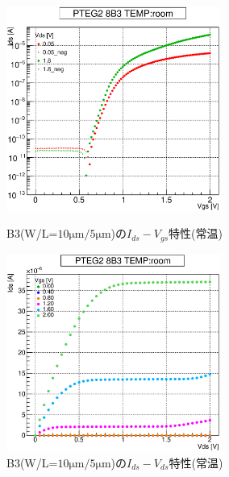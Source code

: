 				\begin{figure}[htbp]
					\begin{minipage}{0.5\hsize}
						\begin{center}
							\includegraphics[width=70mm]{./Chapter/Appendix/Picture/NBT/B3/PTEG2_8_B3_IdVg_room.eps}
						\end{center}
						\caption{B3(W/L=$10\mathrm{\mu m}/5\mathrm{\mu m}$)の$I_{ds}-V_{gs}$特性(常温)}
						\label{fig:B3_IdVg_room}
					\end{minipage}
					\begin{minipage}{0.5\hsize}
						\begin{center}
							\includegraphics[width=70mm]{./Chapter/Appendix/Picture/NBT/B3/PTEG2_8_B3_IdVd_room.eps}
						\end{center}
						\caption{B3(W/L=$10\mathrm{\mu m}/5\mathrm{\mu m}$)の$I_{ds}-V_{ds}$特性(常温)}
						\label{fig:B3_IdVd_room}
					\end{minipage}
				\end{figure}
